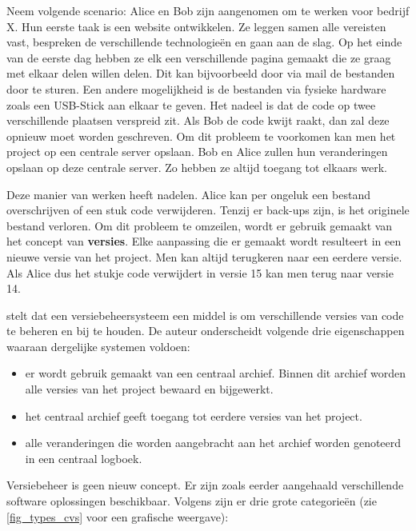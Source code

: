 Neem volgende scenario: Alice en Bob zijn aangenomen om te werken voor bedrijf X. Hun eerste taak is een website ontwikkelen. Ze leggen samen alle vereisten vast, bespreken de verschillende technologieën en gaan aan de slag. Op het einde van de eerste dag hebben ze elk een verschillende pagina gemaakt die ze graag met elkaar delen willen delen. Dit kan bijvoorbeeld door via mail de bestanden door te sturen. Een andere mogelijkheid is de bestanden via fysieke hardware zoals een USB-Stick aan elkaar te geven. Het nadeel is dat de code op twee verschillende plaatsen verspreid zit. Als Bob de code kwijt raakt, dan zal deze opnieuw moet worden geschreven. Om dit probleem te voorkomen kan men het project op een centrale server opslaan. Bob en Alice zullen hun veranderingen opslaan op deze centrale server. Zo hebben ze altijd toegang tot elkaars werk. 

Deze manier van werken heeft nadelen. Alice kan per ongeluk een bestand overschrijven of een stuk code verwijderen. Tenzij er back-ups zijn, is het originele bestand verloren. Om dit probleem te omzeilen, wordt er gebruik gemaakt van het concept van \textbf{versies}. Elke aanpassing die er gemaakt wordt resulteert in een nieuwe versie van het project. Men kan altijd terugkeren naar een eerdere versie. Als Alice dus het stukje code verwijdert in versie 15 kan men terug naar versie 14.

\textcite{Loeliger2009} stelt dat een versiebeheersysteem een middel is om verschillende versies van code te beheren en bij te houden. De auteur onderscheidt volgende drie eigenschappen waaraan dergelijke systemen voldoen:

\begin{itemize}
	\item er wordt gebruik gemaakt van een centraal archief. Binnen dit archief worden alle versies van het project bewaard en bijgewerkt.
	\item het centraal archief geeft toegang tot eerdere versies van het project.
	\item alle veranderingen die worden aangebracht aan het archief worden genoteerd in een centraal logboek.
\end{itemize}

Versiebeheer is geen nieuw concept. Er zijn zoals eerder aangehaald verschillende software oplossingen beschikbaar. Volgens \textcite{Chacon2014} zijn er drie grote categorieën (zie \ref{fig_types_cvs} voor een grafische weergave):

